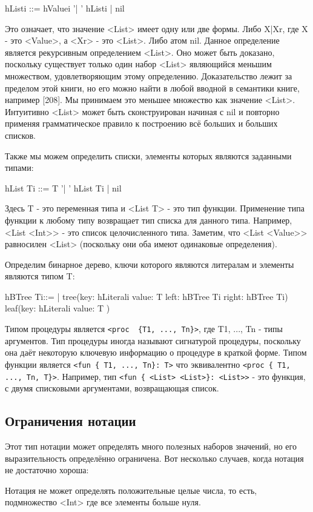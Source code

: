hListi ::= hValuei '| ' hListi
| nil

Это означает, что значение <List> имеет одну или две формы. Либо X|Xr, где X - это <Value>, а <Xr> - это <List>. Либо атом nil. Данное определение является рекурсивным определением <List>. Оно может быть доказано, поскольку существует только один набор <List> являющийся меньшим множеством, удовлетворяющим этому определению. Доказательство лежит за пределом этой книги, но его можно найти в любой вводной в семантики книге, например [208]. Мы принимаем это меньшее множество как значение <List>. Интуитивно <List> может быть сконструирован начиная с nil и повторно применяя грамматическое правило к построению всё больших и больших списков.

Также мы можем определить списки, элементы которых являются заданными типами:

hList Ti ::= T '| ' hList Ti
| nil

Здесь T - это переменная типа и <List T> - это тип функции. Применение типа функции к любому типу возвращает тип списка для данного типа. Например, <List <Int>> - это список целочисленного типа. Заметим, что <List <Value>> равносилен <List> (поскольку они оба имеют одинаковые определения).

Определим бинарное дерево, ключи которого являются литералам и элементы являются типом T:

hBTree Ti::=
|
tree(key: hLiterali value: T
left: hBTree Ti right: hBTree Ti)
leaf(key: hLiterali value: T )

Типом процедуры является \lstinline|<proc  {T1, ..., Tn}>|, где T1, ..., Tn - типы аргументов. Тип процедуры иногда называют сигнатурой процедуры, поскольку она даёт некоторую ключевую информацию о процедуре в краткой форме. Типом функции является \lstinline|<fun { T1, ..., Tn}: T>| что эквивалентно \lstinline|<proc { T1, ..., Tn, T}>|. Например, тип \lstinline|<fun { <List> <List>}: <List>>| - это функция, с двумя списковыми аргументами, возвращающая список.

\subsection*{Ограничения нотации}

Этот тип нотации может определять много полезных наборов значений, но его выразительность определённо ограничена. Вот несколько случаев, когда нотация не достаточно хороша:

Нотация не может определять положительные целые числа, то есть, подмножество <Int> где все элементы больше нуля.

